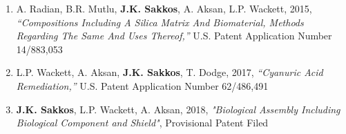 


\begin{cvparagraph}
\begin{enumerate}
	\item {A. Radian, B.R. Mutlu, \textbf{J.K. Sakkos}, A. Aksan, L.P. Wackett, 2015, \textit{“Compositions Including A Silica Matrix And Biomaterial, Methods Regarding The Same And Uses Thereof,”} U.S. Patent Application Number 14/883,053}
	\item {L.P. Wackett, A. Aksan, \textbf{J.K. Sakkos}, T. Dodge, 2017, \textit{“Cyanuric Acid Remediation,”} U.S. Patent Application Number 62/486,491}
	\item \textbf{J.K. Sakkos}, L.P. Wackett, A. Aksan, 2018, \textit{"Biological Assembly Including Biological Component and Shield"}, Provisional Patent Filed


\end{enumerate}
\end{cvparagraph}
